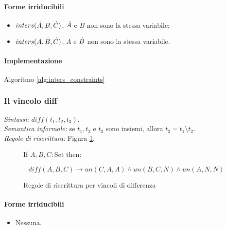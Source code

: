 \documentclass[12pt,a4paper,openright]{book} %
\begin{document}
\paragraph{Forme irriducibili}
\begin{itemize}
	\item $inters(\dot{A}, B, \dot{C})$, $\dot{A}$ e $B$ non sono la stessa variabile;
	\item $inters(A, \dot{B}, \dot{C})$, $A$ e $\dot{B}$ non sono la stessa variabile.
\end{itemize}

\paragraph{Implementazione}
Algoritmo \ref{alg:inters_constraints}

\subsubsection{Il vincolo diff}

\textit{Sintassi:} $diff(t_1,t_2,t_3)$.\\
\noindent\textit{Semantica informale:} se $t_1, t_2$ e $t_3$ sono insiemi, allora $t_3 = t_1 \setminus t_2$.\\
\noindent\textit{Regole di riscrittura:} Figura \ref{fig:difference_constraints}.

\begin{figure}
	\begin{tcolorbox}[colframe=black, colback=white, sharp corners]
		\setcounter{equation}{0}
		\renewcommand{\theequation}{\textsubscript{\arabic{equation}}}

		If $A, B, C: \text{Set}$ then:

		\begin{equation}
		diff(A,B,C) \to un(C,A,A) \land un(B,C,N) \land un(A,N,N)
		\end{equation}

	\end{tcolorbox}

	\caption{Regole di riscrittura per vincoli di differenza}
	\label{fig:difference_constraints}
\end{figure}

\paragraph{Forme irriducibili}
\begin{itemize}
	\item Nessuna.
\end{itemize}
\end{document}
